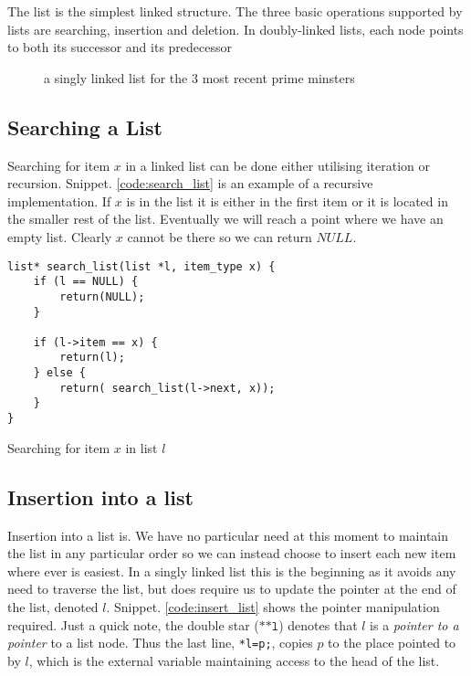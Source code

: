 	The list is the simplest linked structure. The three basic operations supported by lists are searching, insertion and deletion. In doubly-linked lists, each node points to both its successor and its predecessor

	\begin{figure}[h]
		\centering
		\caption{\label{fig:singlylinkedlist} a singly linked list for the 3 most recent prime minsters}
	\end{figure}

	\subsection{Searching a List}
		Searching for item $x$ in a linked list can be done either utilising iteration or recursion. Snippet. \ref{code:search_list} is an example of a recursive implementation. If $x$ is in the list it is either in the first item or it is located in the smaller rest of the list. Eventually we will reach a point where we have an empty list. Clearly $x$ cannot be there so we can return $NULL$.
	\begin{listing}[h!]
		\begin{verbatim}
list* search_list(list *l, item_type x) {
	if (l == NULL) {
		return(NULL);
	}

	if (l->item == x) {
		return(l);
	} else {
		return( search_list(l->next, x));
	}
}
\end{verbatim}
	\caption{\label{code:search_list} Searching for item $x$ in list $l$}
\end{listing}

		\subsection{Insertion into a list}
			Insertion into a list is. We have no particular need at this moment to maintain the list in any particular order so we can instead choose to insert each new item where ever is easiest. In a singly linked list this is the beginning as it avoids any need to traverse the list, but does require us to update the pointer at the end of the list, denoted $l$. Snippet. \ref{code:insert_list} shows the pointer manipulation required. Just a quick note, the double star ($\texttt{**l}$) denotes that $l$ is a \textit{pointer to a pointer} to a list node. Thus the last line, \texttt{*l=p;}, copies $p$ to the place pointed to by $l$, which is the external variable maintaining access to the head of the list.

